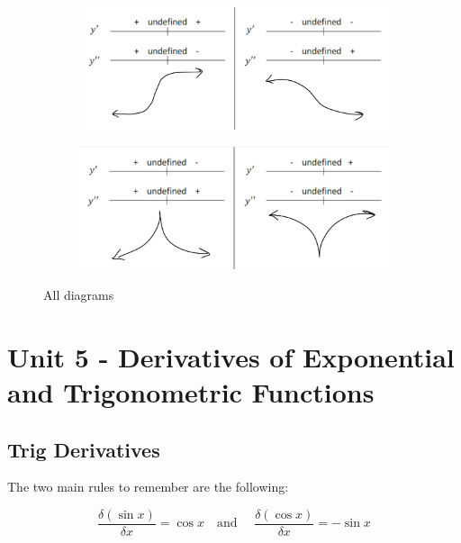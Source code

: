 \documentclass{article}
\begin{document}
\begin{figure}[ht]
    \begin{subfigure}[b]{0.9\textwidth}
        \centering
        \includegraphics[width=\linewidth]{imgs/diagram_5_6.png}
        \caption{}
    \end{subfigure}
    
    \begin{subfigure}[b]{0.9\textwidth}
        \centering
        \includegraphics[width=\linewidth]{imgs/diagram_7_8.png}
        \caption{}
    \end{subfigure}
    
    \caption{All diagrams}
\end{figure}

\clearpage %

\section{Unit 5 - Derivatives of Exponential and Trigonometric Functions}
\subsection{Trig Derivatives}
The two main rules to remember are the following:
\begin{tcolorbox}[sharp corners=uphill,
    colback=purple!50!white,colframe=blue!25!black,coltext=yellow,
    fontupper=\Large\bfseries,arc=6mm,boxrule=2mm,boxsep=5mm]
    $$\frac{\delta (\sin x)}{\delta x}=\cos x \quad \text{and } \quad \frac{\delta(\cos x)}{\delta x}=-\sin x$$
\end{tcolorbox}
\end{document}
